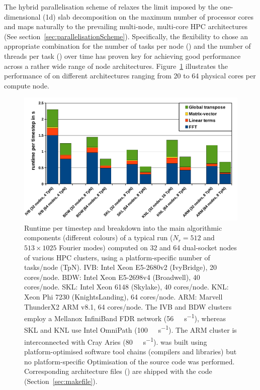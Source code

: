 \documentclass[a4paper, 11pt, DIV=11]{scrartcl}
\begin{document}
The hybrid parallelisation scheme of \nsc relaxes the limit imposed by the one-dimensional (1d)
slab decomposition on the maximum number of processor cores and maps naturally to the
prevailing multi-node, multi-core HPC architectures (See
section~\ref{sec:parallelisationScheme}). Specifically, the flexibility to chose an appropriate
combination for the number of \mpi tasks per node (\tpn) and the number of \omp threads per
\mpi task (\tpt) over time has proven key for achieving good performance across a rather wide
range of node architectures. Figure~\ref{fig:runtime} illustrates the performance of \nsc
on different architectures ranging from \num{20} to \num{64} physical cores per compute node.
\begin{figure}[htb]
\centering
\includegraphics[width=1.00\columnwidth]{figures/nscouetteBenchmark.pdf}
\caption{Runtime per timestep and breakdown into the main algorithmic
components (different colours) of a typical \nsc run ($N_r=\num{512}$ and
$\num{513}\times\num{1025}$ Fourier modes) computed on \num{32} and \num{64}
dual-socket nodes of various HPC clusters, using a platform-specific number
of \mpi tasks/node (TpN).
IVB: Intel Xeon E5-2680v2 (IvyBridge), \num{20} cores/node.
BDW: Intel Xeon E5-2698v4 (Broadwell), \num{40} cores/node.
SKL: Intel Xeon 6148 (Skylake), \num{40} cores/node.
KNL: Xeon Phi 7230 (KnightsLanding), \num{64} cores/node.
ARM: Marvell ThunderX2 ARM v8.1, \num{64} cores/node.
The IVB and BDW clusters employ a Mellanox InfiniBand FDR network
(\SI{56}{\giga\bit\per\second}), whereas SKL and KNL use Intel OmniPath
(\SI{100}{\giga\bit\per\second}). The ARM cluster is interconnected
with Cray Aries (\SI{80}{\giga\bit\per\second}). \nsc was built using
platform-optimised software tool chains (\ie compilers and libraries)
but no platform-specific Optimisation of the source code was performed.
Corresponding architecture files () are shipped with
the code (Section~\ref{sec:makefile}).}
\label{fig:runtime}
\end{figure}
\end{document}
